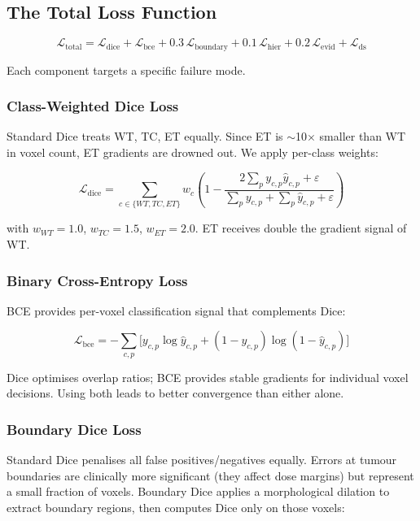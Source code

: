 \documentclass[12pt,a4paper]{article}
\begin{document}
\subsection{The Total Loss Function}

\[
\mathcal{L}_{\text{total}} = \mathcal{L}_{\text{dice}} + \mathcal{L}_{\text{bce}} + 0.3\,\mathcal{L}_{\text{boundary}} + 0.1\,\mathcal{L}_{\text{hier}} + 0.2\,\mathcal{L}_{\text{evid}} + \mathcal{L}_{\text{ds}}
\]

Each component targets a specific failure mode.

\subsubsection{Class-Weighted Dice Loss}

Standard Dice treats WT, TC, ET equally. Since ET is $\sim$10$\times$ smaller than WT in voxel count, ET gradients are drowned out. We apply per-class weights:

\[
\mathcal{L}_{\text{dice}} = \sum_{c \in \{WT,TC,ET\}} w_c \left(1 - \frac{2\sum_p y_{c,p}\hat{y}_{c,p} + \varepsilon}{\sum_p y_{c,p} + \sum_p \hat{y}_{c,p} + \varepsilon}\right)
\]

with $w_{WT}=1.0$, $w_{TC}=1.5$, $w_{ET}=\mathbf{2.0}$. ET receives double the gradient signal of WT.

\subsubsection{Binary Cross-Entropy Loss}

BCE provides per-voxel classification signal that complements Dice:

\[
\mathcal{L}_{\text{bce}} = -\sum_{c,p} \bigl[y_{c,p}\log\hat{y}_{c,p} + (1-y_{c,p})\log(1-\hat{y}_{c,p})\bigr]
\]

Dice optimises overlap ratios; BCE provides stable gradients for individual voxel decisions. Using both leads to better convergence than either alone.

\subsubsection{Boundary Dice Loss}

Standard Dice penalises all false positives/negatives equally. Errors at tumour boundaries are clinically more significant (they affect dose margins) but represent a small fraction of voxels. Boundary Dice applies a morphological dilation to extract boundary regions, then computes Dice only on those voxels:
\end{document}
